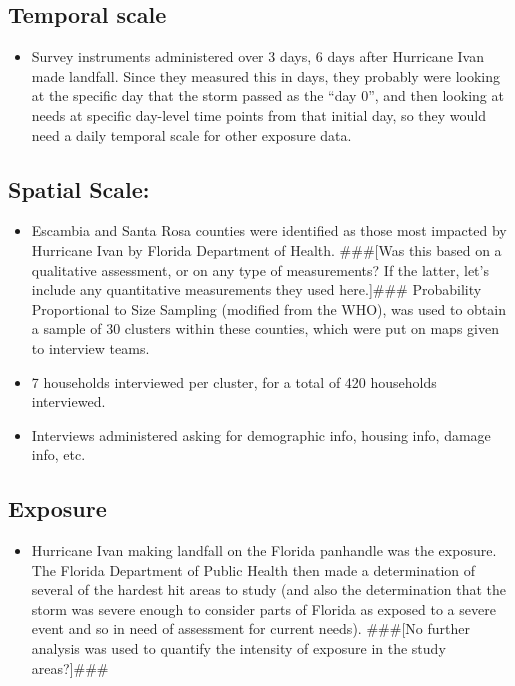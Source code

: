 \documentclass[
]{article}
\providecommand{\tightlist}{%
  \setlength{\itemsep}{0pt}\setlength{\parskip}{0pt}}
\begin{document}
\hypertarget{temporal-scale-1}{%
\subsection{Temporal scale}\label{temporal-scale-1}}

\begin{itemize}
\tightlist
\item
  Survey instruments administered over 3 days, 6 days after Hurricane
  Ivan made landfall. Since they measured this in days, they probably
  were looking at the specific day that the storm passed as the ``day
  0'', and then looking at needs at specific day-level time points from
  that initial day, so they would need a daily temporal scale for other
  exposure data.
\end{itemize}

\hypertarget{spatial-scale-1}{%
\subsection{Spatial Scale:}\label{spatial-scale-1}}

\begin{itemize}
\tightlist
\item
  Escambia and Santa Rosa counties were identified as those most
  impacted by Hurricane Ivan by Florida Department of Health.
  \#\#\#{[}Was this based on a qualitative assessment, or on any type of
  measurements? If the latter, let's include any quantitative
  measurements they used here.{]}\#\#\# Probability Proportional to Size
  Sampling (modified from the WHO), was used to obtain a sample of 30
  clusters within these counties, which were put on maps given to
  interview teams.
\item
  7 households interviewed per cluster, for a total of 420 households
  interviewed.
\item
  Interviews administered asking for demographic info, housing info,
  damage info, etc.
\end{itemize}

\hypertarget{exposure-1}{%
\subsection{Exposure}\label{exposure-1}}

\begin{itemize}
\tightlist
\item
  Hurricane Ivan making landfall on the Florida panhandle was the
  exposure. The Florida Department of Public Health then made a
  determination of several of the hardest hit areas to study (and also
  the determination that the storm was severe enough to consider parts
  of Florida as exposed to a severe event and so in need of assessment
  for current needs). \#\#\#{[}No further analysis was used to quantify
  the intensity of exposure in the study areas?{]}\#\#\#
\end{itemize}
\end{document}
